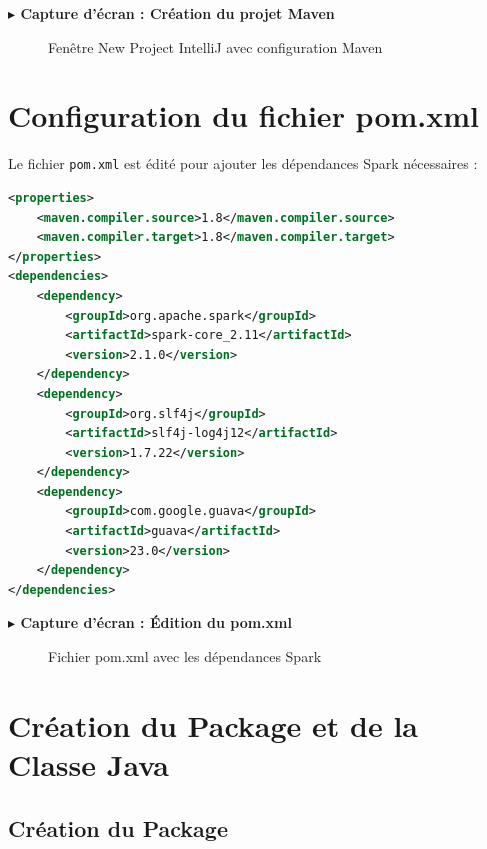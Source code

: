 \documentclass[12pt,a4paper]{report}
\newcommand{\etape}[1]{\vspace{6pt}\textbf{\color{bleuESP}$\blacktriangleright$ #1}\vspace{4pt}}
\begin{document}
\etape{Capture d'écran : Création du projet Maven}
\begin{figure}[H]
  \centering
  \caption{Fenêtre New Project IntelliJ avec configuration Maven}
\end{figure}

\section{Configuration du fichier pom.xml}

Le fichier \texttt{pom.xml} est édité pour ajouter les dépendances Spark nécessaires :

\begin{lstlisting}[language=xml, caption=Contenu du pom.xml]
<properties>
    <maven.compiler.source>1.8</maven.compiler.source>
    <maven.compiler.target>1.8</maven.compiler.target>
</properties>
<dependencies>
    <dependency>
        <groupId>org.apache.spark</groupId>
        <artifactId>spark-core_2.11</artifactId>
        <version>2.1.0</version>
    </dependency>
    <dependency>
        <groupId>org.slf4j</groupId>
        <artifactId>slf4j-log4j12</artifactId>
        <version>1.7.22</version>
    </dependency>
    <dependency>
        <groupId>com.google.guava</groupId>
        <artifactId>guava</artifactId>
        <version>23.0</version>
    </dependency>
</dependencies>
\end{lstlisting}

\etape{Capture d'écran : Édition du pom.xml}
\begin{figure}[H]
  \centering
  \caption{Fichier pom.xml avec les dépendances Spark}
\end{figure}

\section{Création du Package et de la Classe Java}

\subsection{Création du Package}
\end{document}
